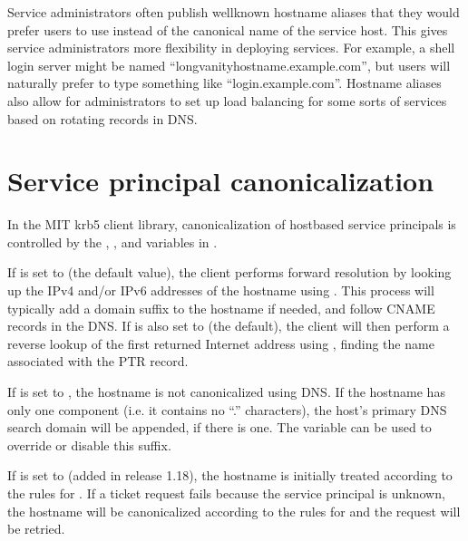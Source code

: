 \documentclass[letterpaper,10pt,english]{sphinxmanual}
\begin{document}
\sphinxAtStartPar
Service administrators often publish well\sphinxhyphen{}known hostname aliases that
they would prefer users to use instead of the canonical name of the
service host.  This gives service administrators more flexibility in
deploying services.  For example, a shell login server might be named
“long\sphinxhyphen{}vanity\sphinxhyphen{}hostname.example.com”, but users will naturally prefer to
type something like “login.example.com”.  Hostname aliases also allow
for administrators to set up load balancing for some sorts of services
based on rotating  records in DNS.


\section{Service principal canonicalization}
\label{\detokenize{admin/princ_dns:service-principal-canonicalization}}
\sphinxAtStartPar
In the MIT krb5 client library, canonicalization of host\sphinxhyphen{}based service
principals is controlled by the ,
, and  variables in {\hyperref[\detokenize{admin/conf_files/krb5_conf:libdefaults}]{}}.

\sphinxAtStartPar
If  is set to  (the default
value), the client performs forward resolution by looking up the IPv4
and/or IPv6 addresses of the hostname using .  This
process will typically add a domain suffix to the hostname if needed,
and follow CNAME records in the DNS.  If  is also set to
 (the default), the client will then perform a reverse lookup
of the first returned Internet address using ,
finding the name associated with the PTR record.

\sphinxAtStartPar
If  is set to , the hostname is
not canonicalized using DNS.  If the hostname has only one component
(i.e. it contains no “.” characters), the host’s primary DNS search
domain will be appended, if there is one.  The 
variable can be used to override or disable this suffix.

\sphinxAtStartPar
If  is set to  (added in
release 1.18), the hostname is initially treated according to the
rules for .  If a ticket request
fails because the service principal is unknown, the hostname will be
canonicalized according to the rules for
 and the request will be retried.
\end{document}
